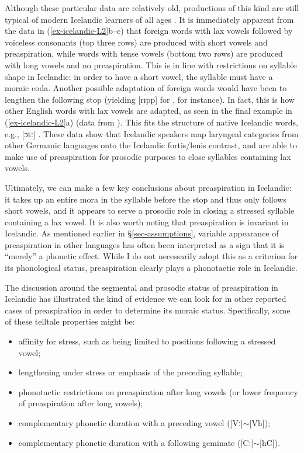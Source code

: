 \documentclass[output=paper,colorlinks,citecolor=brown]{langscibook}
\begin{document}
Although these particular data are relatively old, productions of this kind are still typical of modern Icelandic learners of all ages \citep{sigurjonsson2015}. It is immediately apparent from the data in (\ref{ex-icelandic-L2}b--c) that foreign words with lax vowels followed by voiceless consonants (top three rows) are produced with short vowels and preaspiration, while words with tense vowels (bottom two rows) are produced with long vowels and no preaspiration. This is in line with restrictions on syllable shape in Icelandic: in order to have a short vowel, the syllable must have a moraic coda. Another possible adaptation of foreign words would have been to lengthen the following stop (yielding [rɪpp] for , for instance). In fact, this is how other English words with lax vowels are adapted, as seen in the final example in (\ref{ex-icelandic-L2}a) (data from \citealp{kvaransvavarsdottir2004}). This fits the structure of native Icelandic words, e.g., 
[ɔtː]  \citep[14]{thrainsson1978}. These data show that Icelandic speakers map laryngeal categories
from other Germanic languages onto the Icelandic fortis/lenis contrast, and are able to make use of preaspiration for prosodic purposes to close syllables containing lax vowels.

Ultimately, we can make a few key conclusions about preaspiration in Icelandic: it takes up an entire mora in the syllable before the stop and thus only follows short vowels, and it appears to serve a prosodic role in closing a stressed syllable containing a lax vowel. It is also worth noting that preaspiration is invariant in Icelandic. As mentioned earlier in \S\ref{sec-assumptions}, variable appearance of preaspiration in other languages has often been interpreted as a sign that it is ``merely'' a phonetic effect. While I do not necessarily adopt this as a criterion for its phonological status, preaspiration clearly plays a phonotactic role in Icelandic. 

The discussion around the segmental and prosodic status of preaspiration in Icelandic has illustrated the kind of evidence we can look for in other reported cases of preaspiration in order to determine its moraic status. Specifically, some of these telltale properties might be:

\begin{itemize}
	\item	affinity for stress, such as being limited to positions following a stressed vowel;
	\item 	lengthening under stress or emphasis of the preceding syllable;
	\item 	phonotactic restrictions on preaspiration after long vowels (or lower frequency of preaspiration after long vowels);
	\item	complementary phonetic duration with a preceding vowel ([Vː]$\sim$[V{h}]);
	\item 	complementary phonetic duration with a following geminate ([Cː]$\sim$[{h}C]).
\end{itemize}
\end{document}
